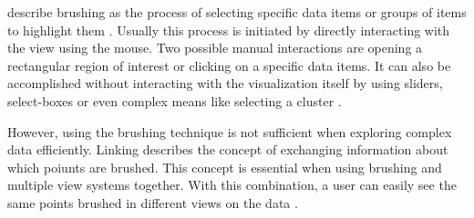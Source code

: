 \citeauthor{Martin:1995} describe brushing as the process of selecting specific data items or groups of items to highlight them . Usually this process is initiated by directly interacting with the view using the mouse. Two possible manual interactions are opening a rectangular region of interest or clicking on a specific data items. It can also be accomplished without interacting with the visualization itself by using sliders, select-boxes or even complex means like selecting a cluster .

However, using the brushing technique is not sufficient when exploring complex data efficiently. Linking describes the concept of exchanging information about which poiunts are brushed. This concept is essential when using brushing and multiple view systems together. With this combination, a user can easily see the same points brushed in different views on the data .


